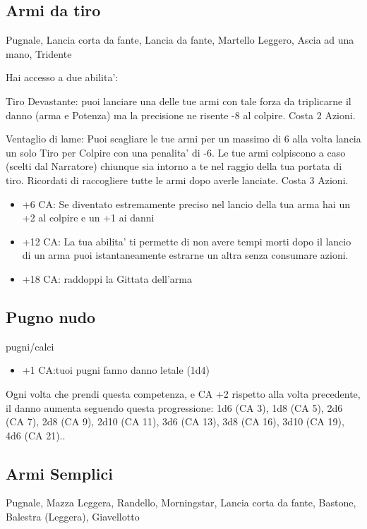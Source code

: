 \documentclass[a4paper,11pt,twoside,openany]{book}
\begin{document}
	\subsection{Armi da tiro} Pugnale, Lancia corta da fante, Lancia da fante, Martello Leggero, Ascia ad una mano, Tridente
	
	Hai accesso a due abilita':
	
	Tiro Devastante: puoi lanciare una delle tue armi con tale forza da triplicarne il danno (arma e Potenza) ma la precisione ne risente -8 al colpire. Costa 2 Azioni.
	
	Ventaglio di lame: Puoi scagliare le tue armi per un massimo di 6 alla volta lancia un solo Tiro per Colpire con una penalita' di -6. Le tue armi colpiscono a caso (scelti dal Narratore) chiunque sia intorno a te nel raggio della tua portata di tiro. Ricordati di raccogliere tutte le armi dopo averle lanciate. Costa 3 Azioni.
	
	\begin{itemize}
		\item +6 CA: Se diventato estremamente preciso nel lancio della tua arma hai un +2 al colpire e un +1 ai danni
		
		\item +12 CA: La tua abilita' ti permette di non avere tempi morti dopo il lancio di un arma puoi istantaneamente estrarne un altra senza consumare azioni.
		
		\item +18 CA: raddoppi la Gittata dell'arma
	\end{itemize}
	
	\subsection{Pugno nudo} pugni/calci
	
	\begin{itemize}
		\item +1 CA:tuoi pugni fanno danno letale (1d4)
	\end{itemize}
	
	Ogni volta che prendi questa competenza, e CA +2 rispetto alla volta precedente, il danno aumenta seguendo questa progressione: 1d6 (CA 3), 1d8 (CA 5), 2d6 (CA 7), 2d8 (CA 9), 2d10 (CA 11), 3d6 (CA 13), 3d8 (CA 16), 3d10 (CA 19), 4d6 (CA 21)..
	
	\subsection{Armi Semplici} Pugnale, Mazza Leggera, Randello, Morningstar, Lancia corta da fante, Bastone, Balestra (Leggera), Giavellotto
	
\end{document}
